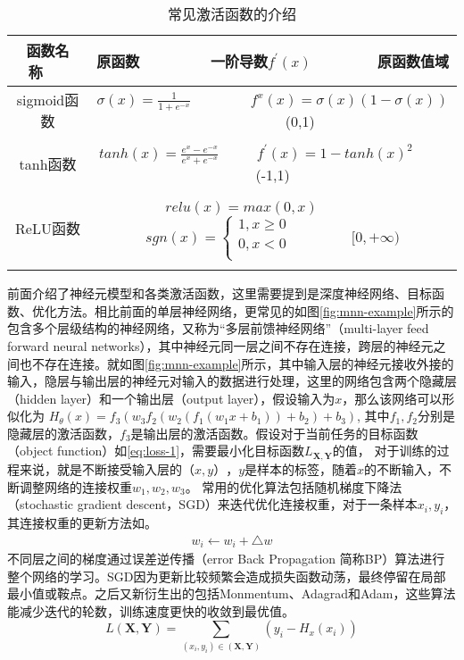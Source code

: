 \begin{table}[htpb]
  \centering
  \caption{常见激活函数的介绍}
  \label{tab:activate-func}
  \begin{tabular}{c|c}
    \toprule
    函数名称~~~ & 原函数 ~~~~~~~~一阶导数$f^{'}(x)$~~~~~~~~原函数值域 \\
    \midrule
    sigmoid函数 & $\sigma(x) = \frac{1}{1+e^{-x}}$ ~~~~~~~ $f^{x}(x)=\sigma(x)(1-\sigma(x))$ ~~~~~~~ (0,1) \\ \\
    tanh函数 & $tanh(x) = \frac{e^x-e^{-x}}{e^x+e^{-x}}$ ~~~~ $f^{'}(x)=1-tanh(x)^{2}$ ~~~~ (-1,1) \\ \\
    ReLU函数 & $relu(x) = max(0,x)$ ~~~~~~~~  $sgn(x)=\left\{ \begin{aligned} 1, x\geq 0 \\ 0, x<0 \\ \end{aligned} \right.$ ~~~~~~~ $ [0,+\infty)$ \\ \\
    \bottomrule
  \end{tabular}
\end{table}

前面介绍了神经元模型和各类激活函数，这里需要提到是深度神经网络、目标函数、优化方法。相比前面的单层神经网络，更常见的如图\ref{fig:mnn-example}所示的包含多个层级结构的神经网络，又称为``多层前馈神经网络''（multi-layer feed forward neural networks），其中神经元同一层之间不存在连接，跨层的神经元之间也不存在连接。就如图\ref{fig:mnn-example}所示，其中输入层的神经元接收外接的输入，隐层与输出层的神经元对输入的数据进行处理，这里的网络包含两个隐藏层（hidden layer）和一个输出层（output layer），假设输入为$x$，那么该网络可以形似化为
$H_{\theta}(x) = f_3(w_{3}f_2(w_{2}(f_{1}(w_{1}x+b_1))+b_2)+b_3)$, 其中$f_{1},f_{2}$分别是隐藏层的激活函数，$f_{3}$是输出层的激活函数。假设对于当前任务的目标函数（object function）如\ref{eq:loss-1}，需要最小化目标函数$L_{\mathbf{X},\mathbf{Y}}$的值， 对于训练的过程来说，就是不断接受输入层的$（x,y）$，$y$是样本的标签，随着$x$的不断输入，不断调整网络的连接权重$w_1,w_2,w_3$。 常用的优化算法包括随机梯度下降法（stochastic gradient descent，SGD）来迭代优化连接权重，对于一条样本$x_{i},y_{i}$，其连接权重的更新方法如。
\begin{equation}
    \begin{split}
        w_i  \leftarrow w_i +\bigtriangleup w
    \end{split}
\end{equation}
不同层之间的梯度通过误差逆传播（error Back Propagation 简称BP）\cite{rumelhart1988learning}算法进行整个网络的学习。SGD因为更新比较频繁会造成损失函数动荡，最终停留在局部最小值或鞍点。之后又新衍生出的包括Monmentum、Adagrad\cite{duchi2011adaptive}和Adam\cite{kingma2014adam}，这些算法能减少迭代的轮数，训练速度更快的收敛到最优值。
\begin{equation}\label{eq:loss-1}
    L(\mathbf{X},\mathbf{Y}) = \sum_{(x_i,y_i) \in (\mathbf{X},\mathbf{Y})}(y_{i} - H_{x}(x_{i}))
\end{equation}

